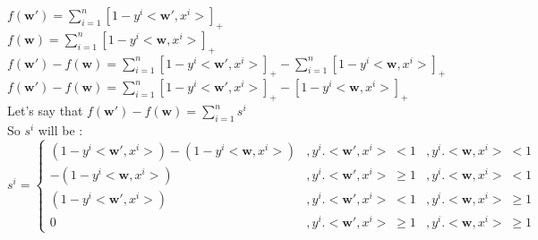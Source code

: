 \documentclass[a4paper,11pt]{article}
\begin{document}
\begin{mlsolution}
\begin{math}
f\left ( \textbf{w}{}' \right ) = \sum_{i=1}^{n} \left [  1 - y^{i}<\textbf{w}{}', x^{i}> \right ]_{+} \end{math}\\

\begin{math}f\left ( \textbf{w} \right ) = \sum_{i=1}^{n} \left [  1 - y^{i}<\textbf{w}, x^{i}> \right ]_{+}
\end{math}\\

\begin{math}
f\left ( \textbf{w}{}' \right ) - f\left ( \textbf{w} \right ) = \sum_{i=1}^{n} \left [  1 - y^{i}<\textbf{w}{}', x^{i}> \right ]_{+} - \sum_{i=1}^{n} \left [  1 - y^{i}<\textbf{w}, x^{i}> \right ]_{+}
\end{math}\\

\begin{math}
f\left ( \textbf{w}{}' \right ) - f\left ( \textbf{w} \right ) = \sum_{i=1}^{n} \left [  1 - y^{i}<\textbf{w}{}', x^{i}> \right ]_{+} - \left [  1 - y^{i}<\textbf{w}, x^{i}> \right ]_{+}
\end{math}\\

Let's say that 
\begin{math}
f\left ( \textbf{w}{}' \right ) - f\left ( \textbf{w} \right ) = \sum_{i=1}^{n} s^{i}
\end{math}\\

So \begin{math}s^{i}\end{math} will be :\\

\begin{math}
s^{i} = \left\{\begin{matrix}
\left ( 1 - y^{i}<\textbf{w}{}', x^{i}>  \right ) - \left ( 1 - y^{i}<\textbf{w}, x^{i}> \right ) & ,y^{i}.<\textbf{w}{}', x^{i}> \; <  1&,  y^{i}.<\textbf{w}, x^{i}> \;< 1\\ 
- \left ( 1 - y^{i}<\textbf{w}, x^{i}> \right ) & ,y^{i}.<\textbf{w}{}', x^{i}> \; \geq  1 & ,  y^{i}.<\textbf{w}, x^{i}> \;< 1\\ 
\left ( 1 - y^{i}<\textbf{w}{}', x^{i}>  \right ) & ,y^{i}.<\textbf{w}{}', x^{i}> \; <  1 & ,  y^{i}.<\textbf{w}, x^{i}> \; \geq 1\\ 
0 & ,y^{i}.<\textbf{w}{}', x^{i}> \; \geq  1 & ,  y^{i}.<\textbf{w}, x^{i}> \; \geq 1
\end{matrix}\right.
\end{math}\\


\end{mlsolution}
\end{document}
